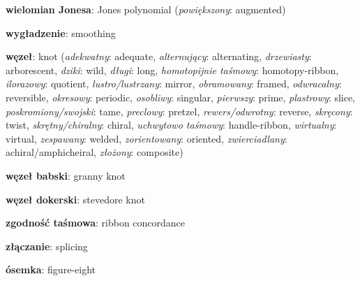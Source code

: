 \item \textbf{wielomian Jonesa}: Jones polynomial
(\emph{powiększony}: augmented)
\item \textbf{wygładzenie}: smoothing
\item \textbf{węzeł}: knot
(\emph{adekwatny}: adequate, \emph{alternujący}: alternating, \emph{drzewiasty}: arborescent, \emph{dziki}: wild, \emph{długi}: long, \emph{homotopijnie taśmowy}: homotopy-ribbon, \emph{ilorazowy}: quotient, \emph{lustro/lustrzany}: mirror, \emph{obramowany}: framed, \emph{odwracalny}: reversible, \emph{okresowy}: periodic, \emph{osobliwy}: singular, \emph{pierwszy}: prime, \emph{plastrowy}: slice, \emph{poskromiony/swojski}: tame, \emph{preclowy}: pretzel, \emph{rewers/odwrotny}: reverse, \emph{skręcony}: twist, \emph{skrętny/chiralny}: chiral, \emph{uchwytowo taśmowy}: handle-ribbon, \emph{wirtualny}: virtual, \emph{zespawany}: welded, \emph{zorientowany}: oriented, \emph{zwierciadlany}: achiral/amphicheiral, \emph{złożony}: composite)
\item \textbf{węzeł babski}: granny knot
\item \textbf{węzeł dokerski}: stevedore knot
\item \textbf{zgodność taśmowa}: ribbon concordance
\item \textbf{złączanie}: splicing
\item \textbf{ósemka}: figure-eight
